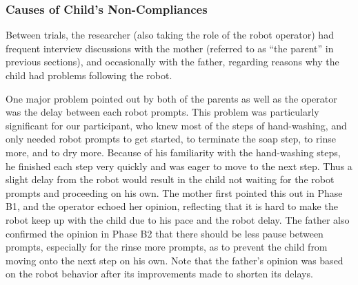 
\subsubsection{Causes of Child's Non-Compliances}
Between trials, the researcher (also taking the role of the robot operator) had frequent interview discussions with the mother (referred to as ``the parent'' in previous sections), and occasionally with the father, regarding reasons why the child had problems following the robot.

One major problem pointed out by both of the parents as well as the operator was the delay between each robot prompts.  This problem was particularly significant for our participant, who knew most of the steps of hand-washing, and only needed robot prompts to get started, to terminate the soap step, to rinse more, and to dry more.  Because of his familiarity with the hand-washing steps, he finished each step very quickly and was eager to move to the next step.  Thus a slight delay from the robot would result in the child not waiting for the robot prompts and proceeding on his own.  The mother first pointed this out in Phase B1, and the operator echoed her opinion, reflecting that it is hard to make the robot keep up with the child due to his pace and the robot delay.  The father also confirmed the opinion in Phase B2 that there should be less pause between prompts, especially for the rinse more prompts, as to prevent the child from moving onto the next step on his own.  Note that the father's opinion was based on the robot behavior after its improvements made to shorten its delays.

